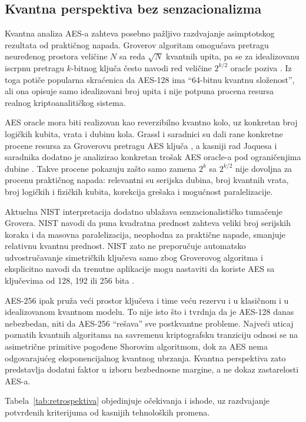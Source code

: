 \subsection{Kvantna perspektiva bez senzacionalizma}

Kvantna analiza AES-a zahteva posebno pažljivo razdvajanje asimptotskog
rezultata od praktičnog napada. Groverov algoritam omogućava pretragu
neuređenog prostora veličine $N$ sa reda $\sqrt{N}$ kvantnih upita,
pa se za idealizovanu iscrpnu pretragu $k$-bitnog ključa često navodi
red veličine $2^{k/2}$ oracle poziva \cite{grover1996}. Iz toga potiče
popularna skraćenica da AES-128 ima ``64-bitnu kvantnu složenost'', ali
ona opisuje samo idealizovani broj upita i nije potpuna procena resursa
realnog kriptoanalitičkog sistema.

AES oracle mora biti realizovan kao reverzibilno kvantno kolo, uz
konkretan broj logičkih kubita, vrata i dubinu kola. Grassl i saradnici
su dali rane konkretne procene resursa za Groverovu pretragu AES ključa
\cite{grassl2016grover}, a kasniji rad Jaquesa i saradnika dodatno je
analizirao konkretan trošak AES oracle-a pod ograničenjima dubine
\cite{jaques2020grover}. Takve procene pokazuju zašto samo zamena
$2^k$ sa $2^{k/2}$ nije dovoljna za procenu praktičnog napada: relevantni
su serijska dubina, broj kvantnih vrata, broj logičkih i fizičkih kubita,
korekcija grešaka i mogućnost paralelizacije.

Aktuelna NIST interpretacija dodatno ublažava senzacionalističko
tumačenje Grovera. NIST navodi da puna kvadratna prednost zahteva veliki
broj serijskih koraka i da masovna paralelizacija, neophodna za praktične
napade, smanjuje relativnu kvantnu prednost. NIST zato ne preporučuje
automatsko udvostručavanje simetričkih ključeva samo zbog Groverovog
algoritma i eksplicitno navodi da trenutne aplikacije mogu nastaviti da
koriste AES sa ključevima od 128, 192 ili 256 bita
\cite{nist_pqc_faq}.

AES-256 ipak pruža veći prostor ključeva i time veću rezervu i u
klasičnom i u idealizovanom kvantnom modelu. To nije isto što i tvrdnja
da je AES-128 danas nebezbedan, niti da AES-256 ``rešava'' sve
postkvantne probleme. Najveći uticaj poznatih kvantnih algoritama na
savremenu kriptografsku tranziciju odnosi se na asimetrične primitive
pogođene Shorovim algoritmom, dok za AES nema odgovarajućeg eksponencijalnog
kvantnog ubrzanja. Kvantna perspektiva zato predstavlja dodatni faktor u
izboru bezbednosne margine, a ne dokaz zastarelosti AES-a.

Tabela~\ref{tab:retrospektiva} objedinjuje očekivanja i ishode, uz
razdvajanje potvrđenih kriterijuma od kasnijih tehnoloških promena.


